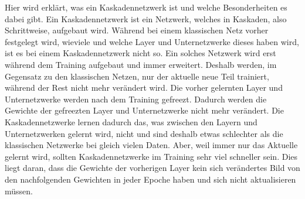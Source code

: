 Hier wird erklärt, was ein Kaskadennetzwerk ist und welche Besonderheiten es dabei gibt. 
Ein Kaskadennetzwerk ist ein Netzwerk, welches in Kaskaden, also Schrittweise, aufgebaut wird. Während bei einem klassischen Netz 
vorher festgelegt wird, wieviele und welche Layer und Unternetzwerke dieses haben wird, ist es bei einem Kaskadennetzwerk nicht so. Ein solches 
Netzwerk 
wird erst während dem Training aufgebaut und immer erweitert. Deshalb werden, im Gegensatz zu den klassischen Netzen, nur der aktuelle neue 
Teil trainiert, während der Rest nicht mehr verändert wird. Die vorher gelernten Layer und Unternetzwerke werden nach dem Training gefreezt. 
Dadurch 
werden die Gewichte der gefreezten Layer und Unternetzwerke nicht mehr verändert. Die Kaskadennetzwerke lernen dadurch das, was zwischen den 
Layern und Unternetzwerken 
gelernt wird, nicht und sind deshalb etwas schlechter als die klassischen Netzwerke bei gleich vielen Daten. Aber, weil immer nur das 
Aktuelle gelernt wird, sollten Kaskadennetzwerke im Training sehr viel schneller sein. Dies liegt daran, dass die Gewichte der vorherigen Layer 
kein sich verändertes Bild von den nachfolgenden Gewichten in jeder Epoche haben und sich nicht aktualisieren müssen. 
